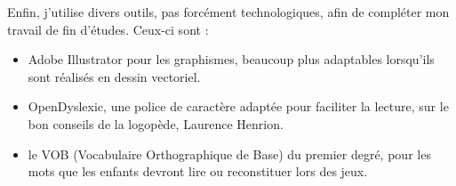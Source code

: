 Enfin, j'utilise divers outils, pas forcément technologiques, afin de compléter mon travail de fin d'études. Ceux-ci sont :
\begin{itemize}
\item Adobe Illustrator pour les graphismes, beaucoup plus adaptables lorsqu'ils sont réalisés en dessin vectoriel.
\item OpenDyslexic, une police de caractère adaptée pour faciliter la lecture, sur le bon conseils de la logopède, Laurence Henrion.
\item le VOB (Vocabulaire Orthographique de Base) du premier degré, pour les mots que les enfants devront lire ou reconstituer lors des jeux.
\end{itemize} 